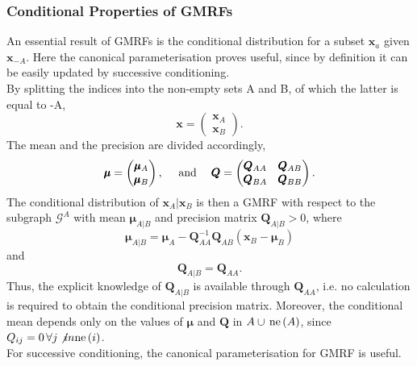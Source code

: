 \documentclass[12pt]{book}
\begin{document}
\subsubsection{Conditional Properties of GMRFs}
An essential result of GMRFs is the conditional distribution for a subset $\pmb{x}_a$ given $\pmb{x}_{-A}$. Here the canonical parameterisation proves useful, since by definition it can be easily updated by successive conditioning. \\
By splitting the indices into the non-empty sets A and B, of which the latter is equal to -A,
\begin{equation}\label{eq:partition_1}
    \pmb{x}=\begin{pmatrix}\pmb{x}_A\\\pmb{x}_B\end{pmatrix}.
\end{equation}
The mean and the precision are divided accordingly,
\begin{equation}\label{eq:partition_2}
    \pmb{\mu}=\begin{pmatrix}\pmb{\mu}_A\\\pmb{\mu}_B\end{pmatrix},\hspace{10pt}\hbox{ and }\hspace{10pt}\pmb{Q}=\begin{pmatrix}\pmb{Q}_{AA} & \pmb{Q}_{AB} \\ \pmb{Q}_{BA} & \pmb{Q}_{BB}\end{pmatrix}.
\end{equation}
The conditional distribution of $\pmb{x}_A|\pmb{x}_B$ is then a GMRF with respect to the subgraph $\mathcal{G}^A$ with mean $\pmb{\mu}_{A|B}$ and precision matrix $\pmb{Q}_{A|B}>0$, where
\begin{equation}
    \pmb{\mu}_{A|B}=\pmb{\mu}_A-\pmb{Q}_{AA}^{-1}\pmb{Q}_{AB}\left(\pmb{x}_B-\pmb{\mu}_B\right)
\end{equation}
and
\begin{equation*}
    \pmb{Q}_{A|B}=\pmb{Q}_{AA}.
\end{equation*}
Thus, the explicit knowledge of $\pmb{Q}_{A|B}$ is available through $\pmb{Q}_{AA}$, i.e. no calculation is required to obtain the conditional precision matrix. Moreover, the conditional mean depends only on the values of $\pmb{\mu}$ and $\pmb{Q}$ in $A\cup\,\hbox{ne}\left(A\right)$, since $Q_{ij} = 0\,\forall j\not in\hbox{ne}\left(i\right)$. \\
For successive conditioning, the canonical parameterisation for GMRF is useful. \\
\end{document}
